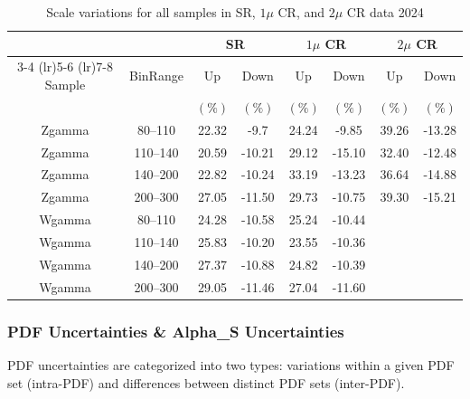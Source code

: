 \begin{table}[!htbp]
    \centering
    \caption{Scale variations for all samples in SR, $1\mu$ CR, and $2\mu$ CR data 2024}
    \label{tab:scalevar_results_alternative_2024}
    \setlength{\tabcolsep}{5pt} %
    \begin{tabular}{
        c c | %
        c c | %
        c c | %
        c c   %
    }
        \toprule
        & & \multicolumn{2}{c}{SR} & \multicolumn{2}{c}{$1\mu$ CR} & \multicolumn{2}{c}{$2\mu$ CR} \\
        \cmidrule(lr){3-4} \cmidrule(lr){5-6} \cmidrule(lr){7-8}
        Sample & BinRange & Up & Down & Up & Down & Up & Down \\ %
               &          & $(\%)$ & $(\%)$ & $(\%)$ & $(\%)$ & $(\%)$ & $(\%)$ \\
        \midrule
        \midrule
        Zgamma & 80--110  & 22.32 & -9.7  & 24.24 & -9.85  & 39.26  & -13.28 \\
        Zgamma & 110--140 & 20.59 & -10.21 & 29.12 & -15.10 & 32.40 & -12.48 \\
        Zgamma & 140--200 & 22.82 & -10.24 & 33.19 & -13.23 & 36.64 & -14.88 \\
        Zgamma & 200--300 & 27.05 & -11.50 & 29.73 & -10.75 & 39.30 & -15.21 \\
        \midrule
        Wgamma & 80--110  & 24.28 & -10.58 & 25.24 & -10.44  & \text{--} & \text{--} \\
        Wgamma & 110--140 & 25.83 & -10.20  & 23.55 & -10.36  & \text{--} & \text{--} \\
        Wgamma & 140--200 & 27.37 & -10.88 & 24.82 & -10.39 & \text{--} & \text{--} \\
        Wgamma & 200--300 & 29.05 & -11.46 & 27.04 & -11.60 & \text{--} & \text{--} \\
        \bottomrule
    \end{tabular}
\end{table}
\subsubsection{PDF Uncertainties \& Alpha\_S Uncertainties}
PDF uncertainties are categorized into two types: variations within a given PDF set (intra-PDF) and differences between distinct PDF sets (inter-PDF).

